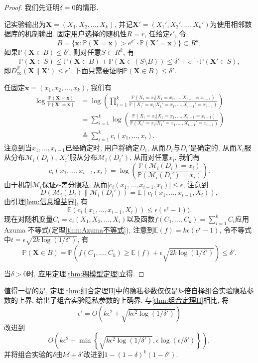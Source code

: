 \begin{proof}
  我们先证明$\delta = 0$的情形.
  
  记实验输出为$\mathbf{X} = (X_1, X_2, \dots, X_k)$, 并记$\mathbf{X}' = (X_1', X_2', \dots, X_k')$为使用相邻数据库的机制输出. 固定用户选择的随机性$R = r$, 任给定$\epsilon'$, 令
  \[
    B = \{\mathbf{x}\colon\mathbb P(\mathbf{X} = \mathbf{x}) > e^{\epsilon'}\cdot\mathbb P(\mathbf{X}' = \mathbf{x})\} \subset R^k,
  \]
  如果$\mathbb P(\mathbf{X} \in B) \le \delta'$, 则对任意$S \subset R^k$, 有
  \[
    \mathbb P(\mathbf{X} \in S) \le \mathbb P(\mathbf{X} \in B) + \mathbb P\left(\mathbf{X} \in \left(S\setminus B\right)\right) \le \delta' + e^{\epsilon'}\cdot \mathbb P(\mathbf{X}' \in S), 
  \]
  即$D_\infty^{\delta'}(\mathbf{X}\|\mathbf{X}')\le\epsilon'$. 下面只需要证明$\mathbb P(\mathbf{X} \in B) \le \delta'$.
  
  任固定$\mathbf{x} = (x_1, x_2, \dots, x_k)$, 我们有
  \[
    \begin{split}
      \log\frac{\mathbb P(\mathbf{X} = \mathbf{x})}{\mathbb P(\mathbf{X}' = \mathbf{x})} &= \log\left( \prod_{i=1}^k \frac{\mathbb P(X_i = x_i|X_1 = x_1, \dots, X_{i-1} = x_{i-1})}{\mathbb P(X_i' = x_i|X_1' = x_1, \dots, X_{i-1}' = x_{i-1})}\right) \\
      &= \sum_{i=1}^k \log\left( \frac{\mathbb P(X_i = x_i|X_1 = x_1, \dots, X_{i-1} = x_{i-1})}{\mathbb P(X_i' = x_i|X_1' = x_1, \dots, X_{i-1}' = x_{i-1})}\right) \\
      &\triangleq \sum_{i=1}^k c_i(x_1, \dots, x_i).
    \end{split}
  \]
  注意到当$x_1, \dots, x_{i-1}$已经确定时, 用户将确定$D_i$, 从而$D_i$与$D_i'$是确定的, 从而$X_i$服从分布$\mathcal{M}_i(D_i)$, $X_i'$服从分布$\mathcal{M}_i(D_i')$, 从而对任意$x_i$, 我们有
  \[
    c_i(x_1, \dots, x_{i-1}, x_i) = \log\left( \frac{\mathbb P(\mathcal{M}_i(D_i) = x_i)}{\mathbb P(\mathcal{M}_i(D_i') = x_i)} \right).
  \]
  由于机制$\mathcal{M}_i$保证$\epsilon$-差分隐私, 从而$|c_i(x_1, \dots, x_{i-1}, x_i)| \le \epsilon$, 注意到
  \[
  D(\mathcal{M}_i(D_i)\|\mathcal{M}_i(D_i')) = \mathbb E(c_i(x_1, \dots, x_{i-1}, X_i)),
  \] 
  由引理\ref{lem:信息增益界}, 有
  \[
    \mathbb E(c_i(x_1, \dots, x_{i-1}, X_i)) \le \epsilon(e^\epsilon - 1)).
  \]
  现在对随机变量$C_i = c_i(X_1, X_2, \dots, X_i)$以及函数$f(C_1,\dots, C_k) = \sum_{i=1}^k C_i$应用 Azuma 不等式(定理\ref{thm:Azuma不等式}), 注意到$\mathbb E(f) = k\epsilon(e^\epsilon - 1)$, 令不等式中$t = \epsilon \sqrt{2k\log(1/\delta')}$, 有
  \[
    \mathbb P(\mathbf{X} \in B) = \mathbb P\left(f(C_1, \dots, C_k)\ge \mathbb E(f) + \epsilon\sqrt{2k\log(1/\delta')}\right) \le \delta'.
  \]
  
  当$\delta > 0$时, 应用定理\ref{thm:稠模型定理}立得.
\end{proof}
值得一提的是, 定理\ref{thm:组合定理II}中的隐私参数仅仅是$k$-倍自择组合实验隐私参数的上界, \parencite{oh2013composition} 给出了组合实验隐私参数的上确界. 与\ref{thm:组合定理II}相比, \parencite{oh2013composition}将
\[
\epsilon' = O\left(k\epsilon^2 + \sqrt{k\epsilon^2\log(1/\delta')}\right)
\]
改进到
\[
O\left(k\epsilon^2 + \min\left\{\sqrt{k\epsilon^2\log(1/\delta')}, \epsilon\log(\epsilon/\delta')\right\}\right),
\]
并将组合实验的$\delta$由$k\delta + \delta'$改进到$1 - (1-\delta)^k(1 - \delta')$.

